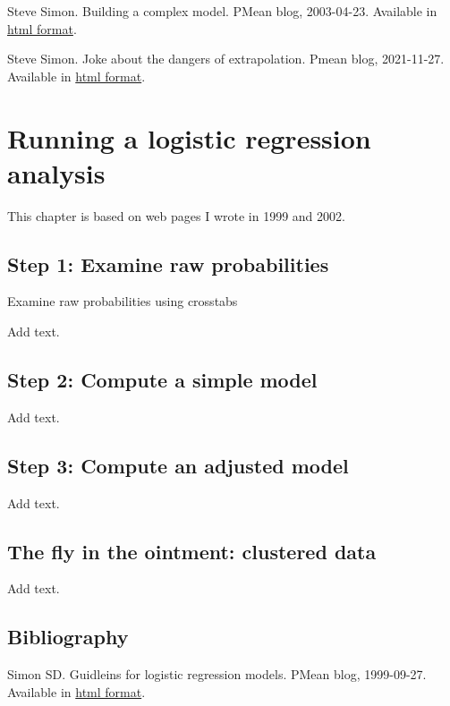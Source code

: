 \documentclass[
  letterpaper,
  DIV=11,
  numbers=noendperiod]{scrreprt}
\begin{document}
\begin{tcolorbox}
Steve Simon. Building a complex model. PMean blog, 2003-04-23. Available
in \href{http://new.pmean.com/building-complex-models/}{html format}.

Steve Simon. Joke about the dangers of extrapolation. Pmean blog,
2021-11-27. Available in
\href{http://new.pmean.com/extrapolation-joke/}{html format}.


\chapter{Running a logistic regression
analysis}\label{running-a-logistic-regression-analysis}

This chapter is based on web pages I wrote in 1999 and 2002.

\section{Step 1: Examine raw
probabilities}\label{step-1-examine-raw-probabilities}

Examine raw probabilities using crosstabs

Add text.

\section{Step 2: Compute a simple
model}\label{step-2-compute-a-simple-model-1}

Add text.

\section{Step 3: Compute an adjusted
model}\label{step-3-compute-an-adjusted-model}

Add text.

\section{The fly in the ointment: clustered
data}\label{the-fly-in-the-ointment-clustered-data-1}

Add text.

\section{Bibliography}\label{bibliography-11}

Simon SD. Guidleins for logistic regression models. PMean blog,
1999-09-27. Available in
\href{http://pmean.com/posts/steps-in-logistic-regression/index.html}{html
format}.


\end{tcolorbox}
\end{document}

